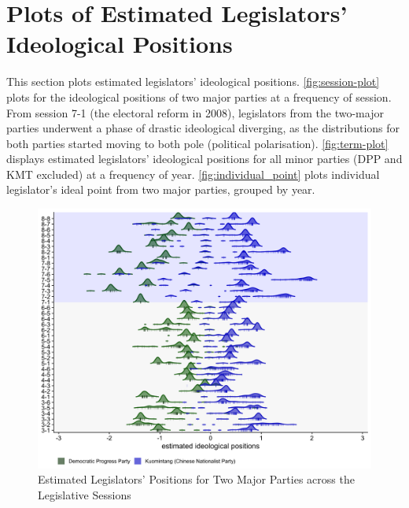 \section{Plots of Estimated Legislators' Ideological Positions\label{sec:Plots full}}

This section plots estimated legislators' ideological positions. \autoref{fig:session-plot} plots for the ideological positions of two major parties at a frequency of session. From session 7-1 (the electoral reform in 2008), legislators from the two-major parties underwent a phase of drastic ideological diverging, as the distributions for both parties started moving to both pole (political polarisation).  \autoref{fig:term-plot} displays estimated legislators' ideological positions for all minor parties (DPP and KMT excluded) at a frequency of year. \autoref{fig:individual_point} plots individual legislator's ideal point from two major parties, grouped by year.

\begin{figure}[H]
\caption{Estimated Legislators' Positions for Two Major Parties across the Legislative Sessions \label{fig:session-plot} }
\centering{}\includegraphics[scale=0.15]{02-Chapter-Two/image/major_postions_session}
\end{figure}

